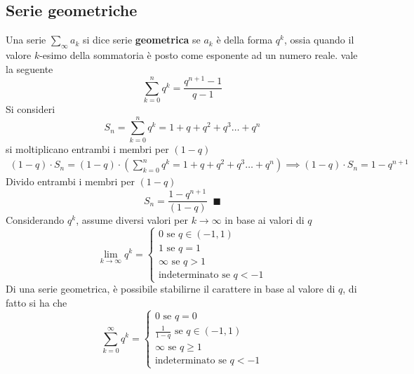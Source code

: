 \documentclass[10pt, letterpaper]{report}
\begin{document}
\subsection{Serie geometriche}
Una serie $\sum_{\infty}a_k$ si dice serie \textbf{geometrica} se 
$a_k$ è della forma $q^k$, ossia quando il valore $k$-esimo della sommatoria 
è posto come esponente ad un numero reale.\acc
\prop{} vale la seguente
$$ \sum_{k=0}^n q^k = \dfrac{q^{n+1}-1}{q-1}$$
\dimo{} Si consideri
$$ S_n =  \sum_{k=0}^n q^k = 1+q+q^2+q^3\dots + q^n$$
si moltiplicano entrambi i membri per $(1-q)$
$$\begin{matrix}
    \displaystyle(1-q)\cdot S_n =(1-q)\cdot 
     (\sum_{k=0}^n q^k = 1+q+q^2+q^3\dots + q^n) \implies  
    (1-q)\cdot S_n = 1-q^{n+1} 
\end{matrix}$$
Divido entrambi i membri per $(1-q)$
$$S_n = \dfrac{1-q^{n+1}}{(1-q)}\;\;\blacksquare$$
Considerando $q^k$, assume diversi valori per $k\rightarrow\infty$ in base 
ai valori di $q$
$$\lim_{k\rightarrow\infty} q^k=\begin{cases}
    0\text{ se }q\in (-1,1)\\ 
    1\text{ se }q=1\\
    \infty\text{ se }q>1\\
    \text{indeterminato se }q<-1
\end{cases} $$
Di una serie geometrica, è possibile stabilirne il carattere in base al 
valore di $q$, di fatto si ha che 
$$ \sum_{k=0}^\infty q^k = \begin{cases}
    0\text{ se }q=0\\ 
    \frac{1}{1-q}\text{ se }q\in (-1,1)\\
    \infty\text{ se }q\ge1\\
    \text{indeterminato se }q<-1
\end{cases}$$
\end{document}
